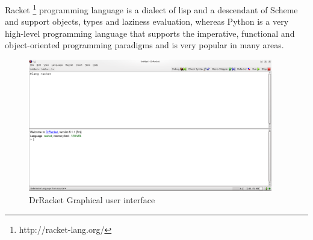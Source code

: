 Racket \footnote{http://racket-lang.org/} programming language is a dialect of lisp and a descendant of Scheme and support objects, types and laziness evaluation,
whereas Python is a very high-level programming language that supports the imperative, functional and object-oriented programming paradigms and is very popular in many areas.




\begin{figure}[htbp]
	\centering
	\includegraphics[width=0.95\textwidth]{img/DrRacketGui.png}
	\caption{DrRacket Graphical user interface}
	\label{fig:DrRacketGui}
\end{figure}





